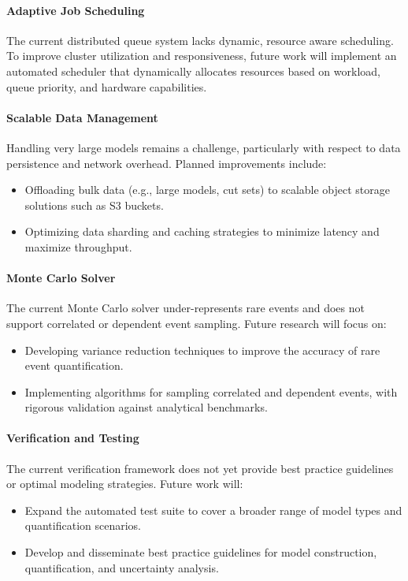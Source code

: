 \paragraph{Adaptive Job Scheduling}

The current distributed queue system lacks dynamic, resource aware scheduling. To improve cluster utilization and responsiveness, future work will implement an automated scheduler that dynamically allocates resources based on workload, queue priority, and hardware capabilities.

\paragraph{Scalable Data Management}

Handling very large models remains a challenge, particularly with respect to data persistence and network overhead. Planned improvements include:
\begin{itemize}
    \item Offloading bulk data (e.g., large models, cut sets) to scalable object storage solutions such as S3 buckets.
    \item Optimizing data sharding and caching strategies to minimize latency and maximize throughput.
\end{itemize}

\paragraph{Monte Carlo Solver}

The current Monte Carlo solver under-represents rare events and does not support correlated or dependent event sampling. Future research will focus on:

\begin{itemize}
    \item Developing variance reduction techniques to improve the accuracy of rare event quantification.
    \item Implementing algorithms for sampling correlated and dependent events, with rigorous validation against analytical benchmarks.
\end{itemize}

\paragraph{Verification and Testing}

The current verification framework does not yet provide best practice guidelines or optimal modeling strategies. Future work will:
\begin{itemize}
    \item Expand the automated test suite to cover a broader range of model types and quantification scenarios.
    \item Develop and disseminate best practice guidelines for model construction, quantification, and uncertainty analysis.
\end{itemize}


